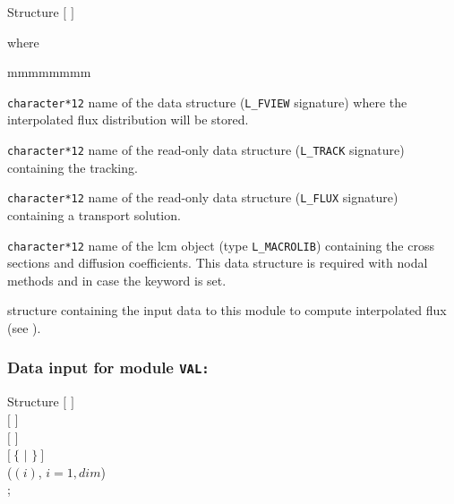 \begin{DataStructure}{Structure }
 \moc{:=}    $[$  $]$ \moc{::}  
\end{DataStructure}

\noindent
where
\begin{ListeDeDescription}{mmmmmmmm}

\item[\dusa{IFLU}] {\tt character*12} name of the  data
structure ({\tt L\_FVIEW} signature) where the interpolated flux distribution will be stored.

\item[\dusa{TRKNAM}] {\tt character*12} name of the read-only  data
structure ({\tt L\_TRACK} signature) containing the tracking. 

\item[\dusa{FLUNAM}] {\tt character*12} name of the read-only  data
structure ({\tt L\_FLUX} signature) containing a transport solution.

\item[\dusa{MACRO}] {\tt character*12} name of the {\sc lcm} object (type {\tt L\_MACROLIB}) containing the cross sections and diffusion coefficients.
This data structure is required with nodal methods and in case the  keyword is set.

\item[\dstr{descval}] structure containing the input data to this module to compute interpolated flux
(see ).

\end{ListeDeDescription}

\subsubsection{Data input for module {\tt VAL:}}\label{sect:descval}

\begin{DataStructure}{Structure }
$[$   $]$ \\
$[$   $]$ \\
$[$   $]$ \\
$[~\{$  $|$  $\}~]$ \\
  ($(i)$, $i=1,dim$) \\
;
\end{DataStructure}

